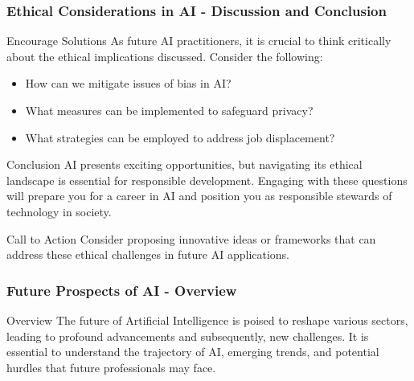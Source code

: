 \documentclass[aspectratio=169]{beamer}
\begin{document}
\begin{frame}[fragile]
    \frametitle{Ethical Considerations in AI - Discussion and Conclusion}
    \begin{block}{Encourage Solutions}
        As future AI practitioners, it is crucial to think critically about the ethical implications discussed. Consider the following:
        \begin{itemize}
            \item How can we mitigate issues of bias in AI?
            \item What measures can be implemented to safeguard privacy?
            \item What strategies can be employed to address job displacement?
        \end{itemize}
    \end{block}

    \begin{block}{Conclusion}
        AI presents exciting opportunities, but navigating its ethical landscape is essential for responsible development. Engaging with these questions will prepare you for a career in AI and position you as responsible stewards of technology in society. 
    \end{block}

    \begin{block}{Call to Action}
        Consider proposing innovative ideas or frameworks that can address these ethical challenges in future AI applications.
    \end{block}
\end{frame}

\begin{frame}[fragile]
    \frametitle{Future Prospects of AI - Overview}
    \begin{block}{Overview}
        The future of Artificial Intelligence is poised to reshape various sectors, leading to profound advancements and subsequently, new challenges.
        It is essential to understand the trajectory of AI, emerging trends, and potential hurdles that future professionals may face.
    \end{block}
\end{frame}
\end{document}
